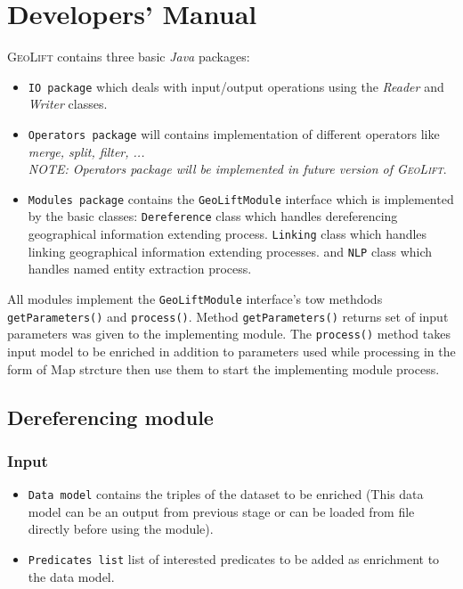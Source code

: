 \documentclass[a4paper,twoside,bibtotoc,abstracton,12pt,BCOR=15mm]{article}
\newcommand{\geolift}{\textsc{GeoLift}\xspace}
\begin{document}
\section{Developers' Manual}
\geolift contains three basic \emph{Java} packages: 
\begin{itemize}
 \item \texttt{IO package} which deals with input/output operations using the \emph{Reader} and \emph{Writer} classes.
 \item\texttt{Operators package} will contains implementation of different operators like \emph{merge, split, filter, ...} 
 \\\emph{NOTE: Operators package will be implemented in future version of \geolift}.
 \item\texttt{Modules package} contains the \texttt{GeoLiftModule} interface which is implemented by the basic classes: 
  \texttt{Dereference} class which handles dereferencing  geographical information extending process. 
 \texttt{Linking} class which handles linking geographical information extending processes. 
 and \texttt{NLP} class which handles named entity extraction process.  
\end{itemize}

 All modules implement the \texttt{GeoLiftModule} interface's tow methdods \texttt{getParameters()} and \texttt{process()}. Method \texttt{getParameters()} returns set of input parameters was given to the implementing module. The \texttt{process()} method takes input model to be enriched in addition to parameters used while processing in the form of Map strcture then use them to start the implementing module process.
\subsection{Dereferencing module}
\subsubsection{Input}
\begin{itemize}
 \item \texttt{Data model} contains the triples of the dataset to be enriched (This data model can be an output from previous stage or can be loaded from file directly before using the module). 
 \item \texttt{Predicates list} list of interested predicates to be added as enrichment to the data model.
\end{itemize}
\end{document}
